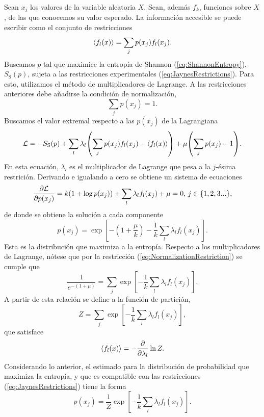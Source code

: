 
Sean $x_{j}$ los valores de la variable aleatoria $X$. Sean, además $f_{k}$, funciones sobre $X$, de las que conocemos su valor esperado. La información accesible se puede escribir como el conjunto de restricciones
\begin{equation}\label{eq:JaynesRestrictions}
    \expval{f_{l}(x)}=\sum_{j}p(x_{j})f_{l}(x_{j}).
\end{equation}
Buscamos $p$ tal que maximice la entropía de Shannon (\ref{eq:ShannonEntropy}), $S_{\text{S}}(p)$, sujeta a las restricciones experimentales (\ref{eq:JaynesRestrictions}). Para esto, utilizamos el método de multiplicadores de Lagrange. A las restricciones anteriores debe añadirse la condición de normalización,
\begin{equation}\label{eq:NormalizationRestriction}
    \sum_{j}p(x_{j})=1.
\end{equation}
Buscamos el valor extremal respecto a las $p(x_{j})$ de la Lagrangiana
\begin{equation}
    \mathcal{L}=-S_{\text{S}}(p)+\sum_{l}\lambda_{l}\qty(\sum_{j}p(x_{j})f_{l}(x_{j})-\expval{f_{l}(x)})+\mu\qty(\sum_{j}p(x_{j})-1).\nonumber
\end{equation}
En esta ecuación, $\lambda_{l}$ es el multiplicador de Lagrange que pesa a la $j$-ésima restrición. Derivando e igualando a cero se obtiene un sistema de ecuaciones
\begin{equation}
    \frac{\partial \mathcal{L}}{\partial p(x_{j})}=k(1+\log{p(x_{j})})+\sum_{l}\lambda_{l}f_{l}(x_{j})+\mu=0,\, j\in\{1,2,3...\},\nonumber
\end{equation}
de donde se obtiene la solución a cada componente
\begin{equation}
    p(x_{j})=\exp[-(1+\frac{\mu}{k})-\frac{1}{k}\sum_{l}\lambda_{l}f_{l}(x_{j})].\nonumber
\end{equation}
Esta es la distribución que maximiza a la entropía. Respecto a los multiplicadores de Lagrange, nótese que por la restricción (\ref{eq:NormalizationRestriction}) se cumple que
\begin{equation}
    \frac{1}{e^{-(1+\mu)}}=\sum_{j}\exp[-\frac{1}{k}\sum_{l}\lambda_{l}f_{l}(x_{j})].\nonumber
\end{equation}
A partir de esta relación se define a la función de partición,
\begin{equation}
    Z=\sum_{j}\exp[-\frac{1}{k}\sum_{l}\lambda_{l}f_{l}(x_{j})],\nonumber
\end{equation}
que satisface
\begin{equation}
    \expval{f_{l}(x)}=-\frac{\partial}{\partial \lambda_{l}}\ln{Z}.\nonumber
\end{equation}
Considerando lo anterior, el estimado para la distribución de probabilidad que maximiza la entropía, y que es compatible con las restricciones (\ref{eq:JaynesRestrictions}) tiene la forma 
\begin{equation}\label{eq:MaxEntDist}
    p(x_{j})=\frac{1}{Z}\exp[-\frac{1}{k}\sum_{l}\lambda_{l}f_{l}(x_{j})].
\end{equation}

